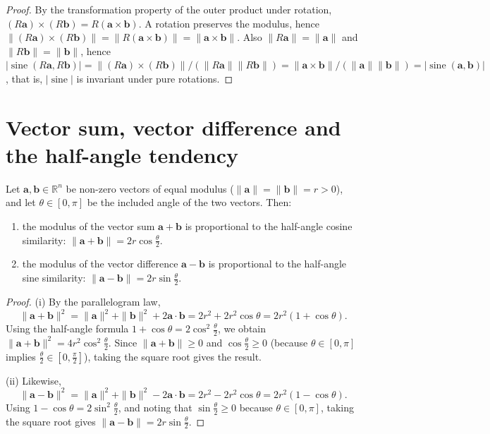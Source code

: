 \begin{proof}
By the transformation property of the outer product under rotation, $(R\mathbf{a}) \times (R\mathbf{b}) = R(\mathbf{a} \times \mathbf{b})$. A rotation preserves the modulus, hence $\|(R\mathbf{a}) \times (R\mathbf{b})\| = \|R(\mathbf{a} \times \mathbf{b})\| = \|\mathbf{a} \times \mathbf{b}\|$. Also $\|R\mathbf{a}\| = \|\mathbf{a}\|$ and $\|R\mathbf{b}\| = \|\mathbf{b}\|$, hence $\lvert\operatorname{sine}(R\mathbf{a}, R\mathbf{b})\rvert = \|(R\mathbf{a}) \times (R\mathbf{b})\| / (\|R\mathbf{a}\| \|R\mathbf{b}\|) = \|\mathbf{a} \times \mathbf{b}\| / (\|\mathbf{a}\| \|\mathbf{b}\|) = \lvert\operatorname{sine}(\mathbf{a}, \mathbf{b})\rvert$, that is, $\lvert\operatorname{sine}\rvert$ is invariant under pure rotations.
\end{proof}

\section{\texorpdfstring{Vector sum, vector difference and the half-angle tendency}{Vector sum, vector difference and the half-angle tendency}}

\begin{proposition}\label{prop:sum_difference_half_angle}
Let $\mathbf{a}, \mathbf{b} \in \mathbb{R}^n$ be non-zero vectors of equal modulus ($\|\mathbf{a}\| = \|\mathbf{b}\| = r>0$), and let $\theta \in [0,\pi]$ be the included angle of the two vectors. Then:
\begin{enumerate}[label=(\roman*)]
    \item the modulus of the vector sum $\mathbf{a} + \mathbf{b}$ is proportional to the half-angle cosine similarity: $\|\mathbf{a} + \mathbf{b}\| = 2r\cos\frac{\theta}{2}$.
    \item the modulus of the vector difference $\mathbf{a} - \mathbf{b}$ is proportional to the half-angle sine similarity: $\|\mathbf{a} - \mathbf{b}\| = 2r\sin\frac{\theta}{2}$.
\end{enumerate}
\end{proposition}

\begin{proof}
(i) By the parallelogram law,
\[\|\mathbf{a} + \mathbf{b}\|^2 = \|\mathbf{a}\|^2 + \|\mathbf{b}\|^2 + 2\mathbf{a}\cdot\mathbf{b} = 2r^2 + 2r^2\cos\theta = 2r^2(1 + \cos\theta).\]
Using the half-angle formula $1 + \cos\theta = 2\cos^2\frac{\theta}{2}$, we obtain $\|\mathbf{a} + \mathbf{b}\|^2 = 4r^2\cos^2\frac{\theta}{2}$. Since $\|\mathbf{a} + \mathbf{b}\| \ge 0$ and $\cos\frac{\theta}{2} \ge 0$ (because $\theta \in [0,\pi]$ implies $\frac{\theta}{2} \in [0,\frac{\pi}{2}]$), taking the square root gives the result.

(ii) Likewise,
\[\|\mathbf{a} - \mathbf{b}\|^2 = \|\mathbf{a}\|^2 + \|\mathbf{b}\|^2 - 2\mathbf{a}\cdot\mathbf{b} = 2r^2 - 2r^2\cos\theta = 2r^2(1 - \cos\theta).\]
Using $1 - \cos\theta = 2\sin^2\frac{\theta}{2}$, and noting that $\sin\frac{\theta}{2}\ge0$ because $\theta\in[0,\pi]$, taking the square root gives $\|\mathbf{a}-\mathbf{b}\|=2r\sin\frac{\theta}{2}$.
\end{proof}

